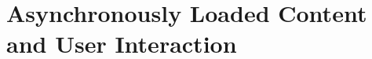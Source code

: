 \begin{comment}
\begin{problem} %
Modify \li{bank_data()} so that it extracts the total consolidated assets (``Consol Assets'') for JPMorgan Chase, Bank of America, and Wells Fargo recorded each December from 2004 to the present.
Return a list of lists where each list contains the assets of each bank.
\end{problem}

\begin{problem} %
The Basketball Reference website at \url{https://www.basketball-reference.com} contains data on NBA athletes, including which player led different categories for each season.
For the past ten seasons, identify which player had the most season points and find how many points they scored during that season.
Return a list of triples consisting of the season, the player, and the points scored, ("season year", "player name", points scored).
\end{problem}
\end{comment}
\begin{comment} %
\begin{enumerate}
\item Load \url{http://www.google.com/finance} into BeautifulSoup.
Towards the bottom of the web page, there is a Sector summary.
Go through each sector and locate the top five Gainers.
In a SQL table, store the Name, abbreviation, \% Change, and Mkt Cap of the top Gainer for each Sector.

\item Load  into BeautifulSoup.
Go through the top five offensive leaders.
In a SQL table, store the name, career games played, career mins per game, career points per game, and career FG\% for each player.

\item Load \url{http://www.foxsports.com/soccer/united-states-women-team-stats} into BeautifulSoup.
Go though each player on the World Cup US women's team.
In a SQL table, store the name, hometown, position, and \# of games played in the World Cup.
\end{enumerate}
\end{comment}

\section*{Asynchronously Loaded Content and User Interaction} %

